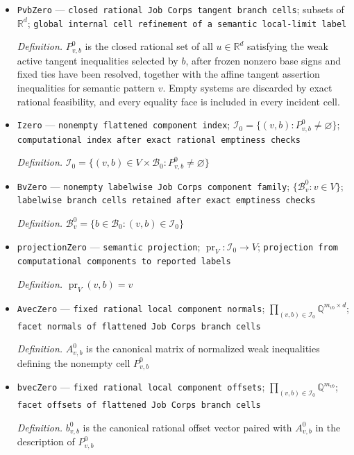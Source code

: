 \documentclass{article}
\begin{document}
\begin{itemize}
  \item \texttt{PvbZero} --- \texttt{closed rational Job Corps tangent branch cells}; subsets of \(\mathbb R^d\); \texttt{global internal cell refinement of a semantic local-\allowbreak{}limit label}
  \par\smallskip\noindent\emph{Definition.} \(P_{v,b}^0\) is the closed rational set of all \(u\in\mathbb R^d\) satisfying the weak active tangent inequalities selected by \(b\), after frozen nonzero base signs and fixed ties have been resolved, together with the affine tangent assertion inequalities for semantic pattern \(v\). Empty systems are discarded by exact rational feasibility, and every equality face is included in every incident cell.
  \item \texttt{Izero} --- \texttt{nonempty flattened component index}; \(\mathcal I_0=\{(v,b):P_{v,b}^0\ne\varnothing\}\); \texttt{computational index after exact rational emptiness checks}
  \par\smallskip\noindent\emph{Definition.} \(\mathcal I_0=\{(v,b)\in V\times\mathcal B_0:P_{v,b}^0\ne\varnothing\}\)
  \item \texttt{BvZero} --- \texttt{nonempty labelwise Job Corps component family}; \(\{\mathcal B_v^0:v\in V\}\); \texttt{labelwise branch cells retained after exact emptiness checks}
  \par\smallskip\noindent\emph{Definition.} \(\mathcal B_v^0=\{b\in\mathcal B_0:(v,b)\in\mathcal I_0\}\)
  \item \texttt{projectionZero} --- \texttt{semantic projection}; \(\operatorname{pr}_V:\mathcal I_0\to V\); \texttt{projection from computational components to reported labels}
  \par\smallskip\noindent\emph{Definition.} \(\operatorname{pr}_V(v,b)=v\)
  \item \texttt{AvecZero} --- \texttt{fixed rational local component normals}; \(\prod_{(v,b)\in\mathcal I_0}\mathbb Q^{m_{vb}\times d}\); \texttt{facet normals of flattened Job Corps branch cells}
  \par\smallskip\noindent\emph{Definition.} \(A_{v,b}^0\) is the canonical matrix of normalized weak inequalities defining the nonempty cell \(P_{v,b}^0\)
  \item \texttt{bvecZero} --- \texttt{fixed rational local component offsets}; \(\prod_{(v,b)\in\mathcal I_0}\mathbb Q^{m_{vb}}\); \texttt{facet offsets of flattened Job Corps branch cells}
  \par\smallskip\noindent\emph{Definition.} \(b_{v,b}^0\) is the canonical rational offset vector paired with \(A_{v,b}^0\) in the description of \(P_{v,b}^0\)

\end{itemize}
\end{document}
